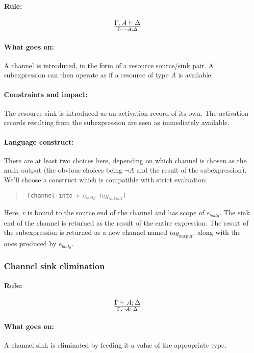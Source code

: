 \documentclass[a4paper]{article}
\begin{document}
\paragraph{Rule:}
$$
{
  \Gamma, A \vdash \Delta
}\over{
  \Gamma \vdash \lnot A; \Delta
}
$$

\paragraph{What goes on:} A channel is introduced, in the form of a
resource source/sink pair. A subexpression can then operate as if a
resource of type $A$ is available.

\paragraph{Constraints and impact:} The resource sink is introduced as
an activation record of its own. The activation records resulting from
the subexpression are seen as immediately available.

\paragraph{Language construct:}
There are at least two choices here, depending on which channel is
chosen as the main output (the obvious choices being $\lnot A$ and the
result of the subexpression).
%
We'll choose a construct which is compatible with strict evaluation:
\begin{quote}\tt
  (channel-into $v$ $e_{body}$ $\mathit{tag}_{output}$)
\end{quote}
Here, $v$ is bound to the source end of the channel and has scope of
$e_{body}$.  The sink end of the channel is returned as the result of
the entire expression.
The result of the subexpression is returned as a new channel named
$\mathit{tag}_{output}$, along with the ones produced by $e_{body}$.

\subsubsection{Channel sink elimination}
\paragraph{Rule:}
$$
{
  \Gamma \vdash A; \Delta
}\over{
  \Gamma, \lnot A \vdash \Delta
}
$$

\paragraph{What goes on:} A channel sink is eliminated by feeding it
a value of the appropriate type.
\end{document}
